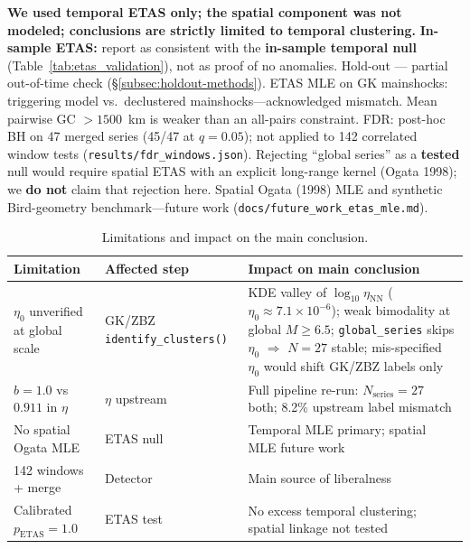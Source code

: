 \documentclass[draft]{agujournal2019}
\begin{document}
\noindent\textbf{We used temporal ETAS only; the spatial component was not modeled;
conclusions are strictly limited to temporal clustering.}
\textbf{In-sample ETAS:} report as consistent with the
\textbf{in-sample temporal null} (Table~\ref{tab:etas_validation}), not as proof of no anomalies.
Hold-out --- partial out-of-time check (\S\ref{subsec:holdout-methods}).
ETAS MLE on GK mainshocks: triggering model vs.\ declustered mainshocks---acknowledged mismatch.
Mean pairwise GC $> 1500$~km is weaker than an all-pairs constraint.
FDR: post-hoc BH on 47 merged series (45/47 at $q=0.05$); not applied to 142
correlated window tests (\texttt{results/fdr\_windows.json}).
Rejecting ``global series'' as a \textbf{tested} null would require spatial ETAS
with an explicit long-range kernel (Ogata 1998); we \textbf{do not} claim that
rejection here.
Spatial Ogata (1998) MLE and synthetic Bird-geometry benchmark---future work
(\texttt{docs/future\_work\_etas\_mle.md}).

\begin{table}[htbp]
\centering
\caption{Limitations and impact on the main conclusion.}
\label{tab:limitations_impact}
\small
\begin{tabular}{p{3.2cm}p{2.8cm}p{6.5cm}}
\hline
\textbf{Limitation} & \textbf{Affected step} & \textbf{Impact on main conclusion} \\
\hline
$\eta_0$ unverified at global scale &
GK/ZBZ \texttt{identify\_clusters()} &
KDE valley of $\log_{10}\eta_\mathrm{NN}$ ($\eta_0 \approx 7.1\times 10^{-6}$);
weak bimodality at global $M\ge 6.5$; \texttt{global\_series} skips $\eta_0$
$\Rightarrow$ $N=27$ stable; mis-specified $\eta_0$ would shift GK/ZBZ labels only \\
$b=1.0$ vs $0.911$ in $\eta$ & $\eta$ upstream & Full pipeline re-run: $N_\mathrm{series}=27$ both; 8.2\% upstream label mismatch \\
No spatial Ogata MLE & ETAS null & Temporal MLE primary; spatial MLE future work \\
142 windows + merge & Detector & Main source of liberalness \\
Calibrated $p_\mathrm{ETAS}=1.0$ & ETAS test & No excess temporal clustering; spatial linkage not tested \\
\hline
\end{tabular}
\end{table}
\end{document}
